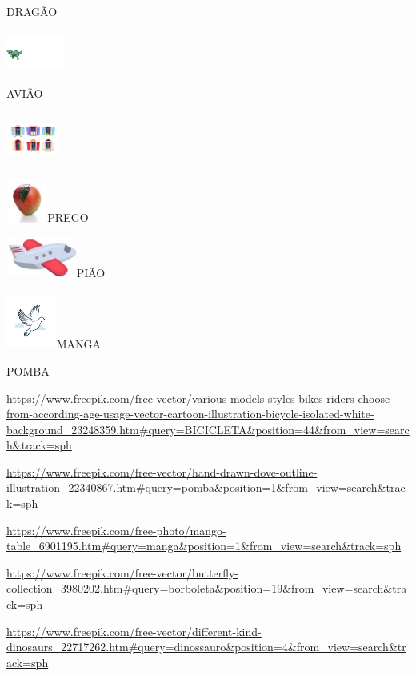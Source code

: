 {{DRAGÃO

\includegraphics[width=0.74931in,height=0.52292in]{media/image62.png}

AVIÃO

\includegraphics[width=0.68542in,height=0.66319in]{media/image63.png}

\includegraphics[width=0.53403in,height=0.56667in]{media/image64.jpeg}PREGO

\includegraphics[width=0.91319in,height=0.52292in]{media/image65.png}PIÃO

\includegraphics[width=0.65385in,height=0.73262in]{media/image66.png}MANGA

POMBA

\url{https://www.freepik.com/free-vector/various-models-styles-bikes-riders-choose-from-according-age-usage-vector-cartoon-illustration-bicycle-isolated-white-background_23248359.htm\#query=BICICLETA\&position=44\&from_view=search\&track=sph}

\url{https://www.freepik.com/free-vector/hand-drawn-dove-outline-illustration_22340867.htm\#query=pomba\&position=1\&from_view=search\&track=sph}

\url{https://www.freepik.com/free-photo/mango-table_6901195.htm\#query=manga\&position=1\&from_view=search\&track=sph}

\url{https://www.freepik.com/free-vector/butterfly-collection_3980202.htm\#query=borboleta\&position=19\&from_view=search\&track=sph}

\url{https://www.freepik.com/free-vector/different-kind-dinosaurs_22717262.htm\#query=dinossauro\&position=4\&from_view=search\&track=sph}

}}
